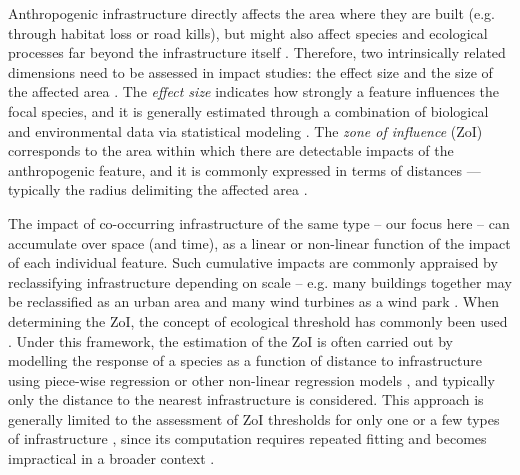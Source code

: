 \documentclass[titlepage]{article}
\begin{document}
Anthropogenic infrastructure directly affects the area where they are built (e.g. through habitat loss or road kills), but might also affect species and ecological processes far beyond the infrastructure itself \citep[e.g. by causing avoidance responses and reducing the probability of animal occurrence in its proximity;][]{johnson_cumulative_2005,torres_assessing_2016,dorber_indicators_2022}. Therefore, two intrinsically related dimensions need to be assessed in impact studies: the effect size and the size of the affected area \citep[Box 1; ][]{naugle_unifying_2011}. The \textit{effect size} indicates how strongly a feature influences the focal species, and it is generally estimated through a combination of biological and environmental data via statistical modeling \citep[Box 1;][]{polfus_identifying_2011}. The \textit{zone of influence} (ZoI) 
corresponds to the area within which there are detectable impacts of the anthropogenic feature, and it is commonly expressed in terms of distances --- typically the radius delimiting the affected area \citep[Box 1;][]{boulanger_estimating_2012}. 

The impact of co-occurring infrastructure of the same type -- our focus here -- can accumulate over space (and time), as a 
linear or non-linear function of the impact of each individual feature. Such cumulative impacts are commonly appraised by reclassifying infrastructure depending on scale -- e.g. many buildings together may be reclassified as an urban area and many wind turbines as a wind park \citep{torres_assessing_2016}.
When determining the ZoI, the concept of ecological threshold
has commonly been used \citep[see][and analytical procedures therein]{ficetola_ecological_2009}. Under this framework, the estimation of the ZoI is often carried out by modelling the response of a species as a function of distance to infrastructure using piece-wise regression or other non-linear regression models \citep[e.g. exponential decay or generalized additive models;][]{skarin_out_2018, ficetola_ecological_2009}, and typically only the distance to the nearest infrastructure is considered. This approach is generally limited to the assessment of ZoI thresholds for only one or a few types of infrastructure \citep[e.g.][]{boulanger_estimating_2012}, since its computation requires repeated fitting and becomes impractical in a broader context \citep{lee_estimating_2020}. 
\end{document}
